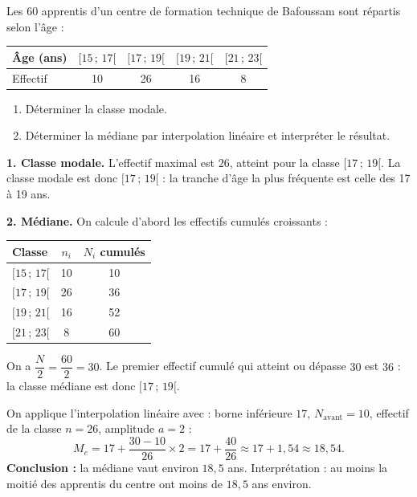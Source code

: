 \documentclass[11pt]{article}
\begin{document}
\begin{exoresolu}
Les $60$ apprentis d'un centre de formation technique de Bafoussam sont répartis selon l'âge :
\begin{center}
\begin{tabular}{|l|cccc|}
\hline
\rowcolor{popblueL} Âge (ans) & $[15\,;\,17[$ & $[17\,;\,19[$ & $[19\,;\,21[$ & $[21\,;\,23[$ \\
\hline
Effectif & 10 & 26 & 16 & 8 \\
\hline
\end{tabular}
\end{center}
\begin{enumerate}
\item Déterminer la classe modale.
\item Déterminer la médiane par interpolation linéaire et interpréter le résultat.
\end{enumerate}
\tcblower
\textbf{1. Classe modale.} L'effectif maximal est $26$, atteint pour la classe $[17\,;\,19[$. La classe modale est donc $[17\,;\,19[$ : la tranche d'âge la plus fréquente est celle des 17 à 19 ans.
\smallskip

\textbf{2. Médiane.} On calcule d'abord les effectifs cumulés croissants :
\begin{center}
\begin{tabular}{|l|c|c|}
\hline
\rowcolor{popblueL} Classe & $n_i$ & $N_i$ cumulés \\
\hline
$[15\,;\,17[$ & 10 & 10 \\
\hline
$[17\,;\,19[$ & 26 & 36 \\
\hline
$[19\,;\,21[$ & 16 & 52 \\
\hline
$[21\,;\,23[$ & 8 & 60 \\
\hline
\end{tabular}
\end{center}
On a $\dfrac{N}{2}=\dfrac{60}{2}=30$. Le premier effectif cumulé qui atteint ou dépasse $30$ est $36$ : la classe médiane est donc $[17\,;\,19[$.
\smallskip

On applique l'interpolation linéaire avec : borne inférieure $17$, $N_{\text{avant}}=10$, effectif de la classe $n=26$, amplitude $a=2$ :
\[ M_e = 17 + \dfrac{30-10}{26}\times 2 = 17 + \dfrac{40}{26} \approx 17 + 1{,}54 \approx 18{,}54. \]
\textbf{Conclusion :} la médiane vaut environ $18{,}5$ ans. Interprétation : au moins la moitié des apprentis du centre ont moins de $18{,}5$ ans environ.
\end{exoresolu}
\end{document}
